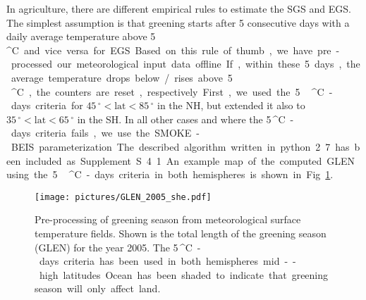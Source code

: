 \documentclass[gmd, manuscript]{copernicus}
\begin{document}
In agriculture, there are different empirical rules to estimate the SGS and EGS. The simplest assumption is that greening starts after 5 consecutive days with a daily average temperature above 5\,\unit{^\circ C} and vice versa for EGS. Based on this rule of thumb, we have pre-processed our meteorological input data offline. If, within these 5 days, the average temperature drops below / rises above 5\,\unit{^\circ C}, the counters are reset, respectively. First, we used the 5\,\unit{^\circ C}-days criteria for $45\,\unit{^\circ} < \text{lat} < 85\,\unit{^\circ}$ in the NH, but extended it also to $35\,\unit{^\circ} < \text{lat} < 65\,\unit{^\circ}$ in the SH. In all other cases and where the 5\,\unit{^\circ C}-days criteria fails, we use the SMOKE-BEIS parameterization. The described algorithm written in python 2.7 has been included as Supplement~S.4.1. An example map of the computed GLEN using the 5\,\unit{^\circ C}-days criteria in both hemispheres is shown in Fig.~\ref{fig:glen_2015_she}.
%
\begin{figure}[t]
  \texttt{[image: pictures/GLEN\_2005\_she.pdf]}
  \caption{Pre-processing of greening season from meteorological surface temperature fields. Shown is the total length of the greening season (GLEN) for the year 2005. The 5\,\unit{^\circ C}-days criteria has been used in both hemispheres mid--high latitudes. Ocean has been shaded to indicate that greening season will only affect land.}
  \label{fig:glen_2015_she}
\end{figure}
%
\end{document}
